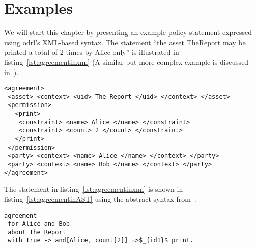 \chapter{Examples}

We will start this chapter by presenting an example policy statement expressed using \ac{odrl}'s XML-based syntax. The statement ``the asset TheReport may be printed a total of 2 times by Alice only'' is illustrated in listing~\ref{lst:agreementinxml} (A similar but more complex example is discussed in~\cite{pucella2006}). 


\lstset{language=XML}
\begin{lstlisting}[caption={First Agreement for Alice and Bob in XML}, label={lst:agreementinxml}]
<agreement>
 <asset> <context> <uid> The Report </uid> </context> </asset>
 <permission>
   <print>
    <constraint> <name> Alice </name> </constraint>
    <constraint> <count> 2 </count> </constraint>
   </print>
 </permission>
 <party> <context> <name> Alice </name> </context> </party>
 <party> <context> <name> Bob </name> </context> </party>
</agreement>
\end{lstlisting}

The statement in listing~\ref{lst:agreementinxml} is shown in listing~\ref{lst:agreementinAST} using the abstract syntax from~\cite{pucella2006}.

\lstset{language=Pucella2006}
\begin{lstlisting}[frame=single, caption={First Agreement for Alice and Bob}, label={lst:agreementinAST}, mathescape]
agreement
 for Alice and Bob 
 about The Report 
 with True -> and[Alice, count[2]] =>$_{id1}$ print.
\end{lstlisting}


